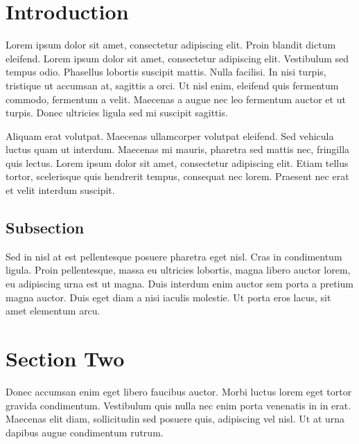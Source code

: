 \documentclass{carver-cyberlaw}
\begin{document}
\section{Introduction}

Lorem ipsum dolor sit amet, consectetur adipiscing elit. Proin blandit dictum 
eleifend. Lorem ipsum dolor sit amet, consectetur adipiscing elit. Vestibulum 
sed tempus odio. Phasellus lobortis suscipit mattis. Nulla facilisi. In nisi 
turpis, tristique ut accumsan at, sagittis a orci. Ut nisl enim, eleifend quis 
fermentum commodo, fermentum a velit. Maecenas a augue nec leo fermentum 
auctor et ut turpis. Donec ultricies ligula sed mi suscipit sagittis.

Aliquam erat volutpat. Maecenas ullamcorper volutpat eleifend. Sed vehicula 
luctus quam ut interdum. Maecenas mi mauris, pharetra sed mattis nec, 
fringilla quis lectus. Lorem ipsum dolor sit amet, consectetur adipiscing 
elit. Etiam tellus tortor, scelerisque quis hendrerit tempus, consequat nec 
lorem. Praesent nec erat et velit interdum suscipit.

\subsection{Subsection}

Sed in nisl at est pellentesque posuere pharetra eget nisl. Cras in 
condimentum ligula. Proin pellentesque, massa eu ultricies lobortis, magna 
libero auctor lorem, eu adipiscing urna est ut magna. Duis interdum enim 
auctor sem porta a pretium magna auctor. Duis eget diam a nisi iaculis 
molestie. Ut porta eros lacus, sit amet elementum arcu.

\section{Section Two}

Donec accumsan enim eget libero faucibus auctor. Morbi luctus lorem eget 
tortor gravida condimentum. Vestibulum quis nulla nec enim porta venenatis in 
in erat. Maecenas elit diam, sollicitudin sed posuere quis, adipiscing vel 
nisl. Ut at urna dapibus augue condimentum rutrum.
\end{document}
